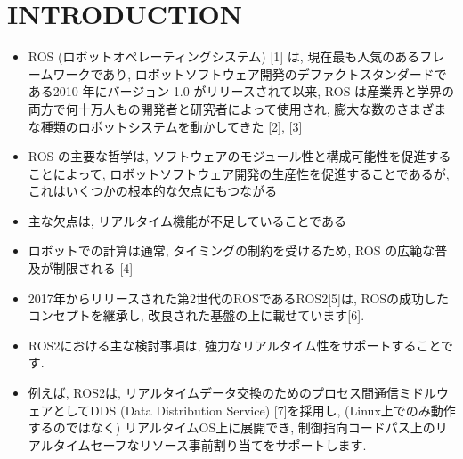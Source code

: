 
\section{INTRODUCTION}
\label{sec: introduction}

\begin{frame}{}
    \begin{itemize}
        \item ROS (ロボットオペレーティングシステム) [1] は, 現在最も人気のあるフレームワークであり, ロボットソフトウェア開発のデファクトスタンダードである2010 年にバージョン 1.0 がリリースされて以来, ROS は産業界と学界の両方で何十万人もの開発者と研究者によって使用され, 膨大な数のさまざまな種類のロボットシステムを動かしてきた [2], [3]
        \item ROS の主要な哲学は, ソフトウェアのモジュール性と構成可能性を促進することによって, ロボットソフトウェア開発の生産性を促進することであるが, これはいくつかの根本的な欠点にもつながる
        \item 主な欠点は, リアルタイム機能が不足していることである
        \item ロボットでの計算は通常, タイミングの制約を受けるため, ROS の広範な普及が制限される [4]
    \end{itemize}
\end{frame}

\begin{frame}{}
    \begin{itemize}
        \item 2017年からリリースされた第2世代のROSであるROS2[5]は, ROSの成功したコンセプトを継承し, 改良された基盤の上に載せています[6].
        \item ROS2における主な検討事項は, 強力なリアルタイム性をサポートすることです.
        \item 例えば, ROS2は, リアルタイムデータ交換のためのプロセス間通信ミドルウェアとしてDDS (Data Distribution Service) [7]を採用し,  (Linux上でのみ動作するのではなく) リアルタイムOS上に展開でき, 制御指向コードパス上のリアルタイムセーフなリソース事前割り当てをサポートします.
    \end{itemize}
\end{frame}

